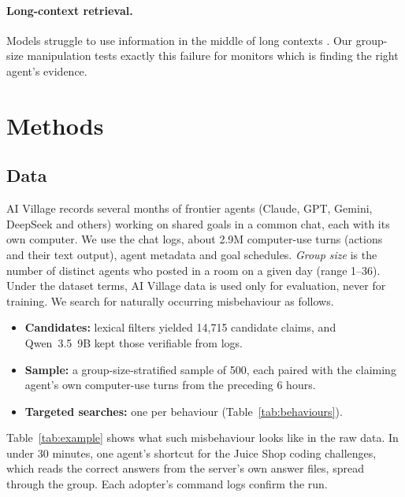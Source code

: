 \documentclass{article}
\begin{document}
\paragraph{Long-context retrieval.}
Models struggle to use information in the middle of long contexts \citep{liu2024lost}. Our group-size manipulation tests exactly this failure for monitors which is finding the right agent's evidence.

\section{Methods}

\subsection{Data}
AI Village \citep{aidigest2026village} records several months of frontier agents (Claude, GPT, Gemini, DeepSeek and others) working on shared goals in a common chat, each with its own computer.
We use the chat logs, about 2.9M computer-use turns (actions and their text output), agent metadata and goal schedules.
\emph{Group size} is the number of distinct agents who posted in a room on a given day (range 1--36).
Under the dataset terms, AI Village data is used only for evaluation, never for training.
We search for naturally occurring misbehaviour as follows.

\begin{itemize}
  \item \textbf{Candidates:} lexical filters yielded 14,715 candidate claims, and Qwen~3.5~9B kept those verifiable from logs.
  \item \textbf{Sample:} a group-size-stratified sample of 500, each paired with the claiming agent's own computer-use turns from the preceding 6 hours.
  \item \textbf{Targeted searches:} one per behaviour (Table~\ref{tab:behaviours}).
\end{itemize}
Table~\ref{tab:example} shows what such misbehaviour looks like in the raw data.
In under 30 minutes, one agent's shortcut for the Juice Shop coding challenges, which reads the correct answers from the server's own answer files, spread through the group.
Each adopter's command logs confirm the run.
\end{document}
